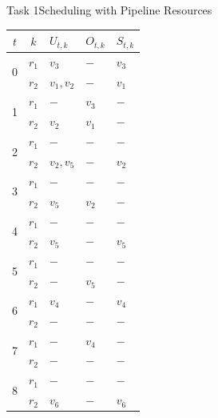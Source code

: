 \begin{frame}{Task 1}{Scheduling with Pipeline Resources}
  \begin{solutionnoinc}
      \centering
      \fontsize{4}{5}\selectfont
      \begin{tabular}{c|c|l|l|l|}
      \hline$t$                  & $k$   & $U_{t, k}$ & $O_{t, k}$ & $S_{t, k}$ \\
      \hline \multirow{2}{*}{0}  & $r_1$ & $v_3$      & $-$        & $v_3$      \\
      \cline { 2 - 5 }           & $r_2$ & $v_1, v_2$ & $-$        & $v_1$      \\
      \hline \multirow{2}{*}{1}  & $r_1$ & $-$        & $v_3$      & $-$        \\
      \cline { 2 - 5 }           & $r_2$ & $v_2$      & $v_1$      & $-$        \\
      \hline \multirow{2}{*}{2}  & $r_1$ & $-$        & $-$        & $-$        \\
      \cline { 2 - 5 }           & $r_2$ & $v_2, v_5$ & $-$        & $v_2$      \\
      \hline \multirow{2}{*}{3}  & $r_1$ & $-$        & $-$        & $-$        \\
      \cline { 2 - 5 }           & $r_2$ & $v_5$      & $v_2$      & $-$        \\
      \hline \multirow{2}{*}{4}  & $r_1$ & $-$        & $-$        & $-$        \\
      \cline { 2 - 5 }           & $r_2$ & $v_5$      & $-$        & $v_5$      \\
      \hline \multirow{2}{*}{5}  & $r_1$ & $-$        & $-$        & $-$        \\
      \cline { 2 - 5 }           & $r_2$ & $-$        & $v_5$      & $-$        \\
      \hline \multirow{2}{*}{6}  & $r_1$ & $v_4$      & $-$        & $v_4$      \\
      \cline { 2 - 5 }           & $r_2$ & $-$        & $-$        & $-$        \\
      \hline \multirow{2}{*}{7}  & $r_1$ & $-$        & $v_4$      & $-$        \\
      \cline { 2 - 5 }           & $r_2$ & $-$        & $-$        & $-$        \\
      \hline \multirow{2}{*}{8}  & $r_1$ & $-$        & $-$        & $-$        \\
      \cline { 2 - 5 }           & $r_2$ & $v_6$      & $-$        & $v_6$      \\

\end{tabular}
\end{solutionnoinc}
\end{frame}
